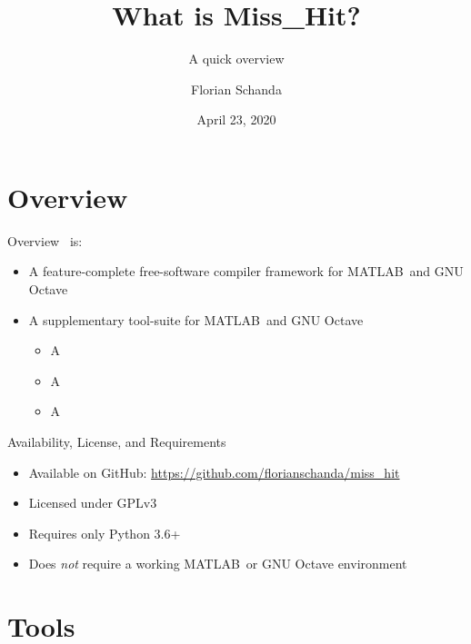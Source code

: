 \documentclass{beamer}
\author{Florian Schanda}
\title{What is {\sc Miss\_Hit}?}
\subtitle{A quick overview}
\date{April 23, 2020}
\newcommand{\mh}[0]{{\sc\structure{Miss\_Hit}}}
\begin{document}
\maketitle

{}

\section{Overview}
\begin{frame}{Overview}
  \mh~is:
  \begin{itemize}
  \item A feature-complete free-software compiler framework for
    MATLAB\texttrademark\ and GNU Octave
    \pause
  \item A supplementary tool-suite for MATLAB\texttrademark\ and GNU
    Octave
    \begin{itemize}
    \item A 
    \item A 
    \item A 
    \end{itemize}
  \end{itemize}
\end{frame}

\begin{frame}{Availability, License, and Requirements}
  \begin{itemize}
  \item Available on GitHub: \url{https://github.com/florianschanda/miss_hit}
  \item Licensed under GPLv3
    \pause
  \item Requires only Python 3.6+
  \item Does \emph{not} require a working MATLAB\texttrademark\ or GNU
    Octave environment
  \end{itemize}
\end{frame}

\section{Tools}
\end{document}
